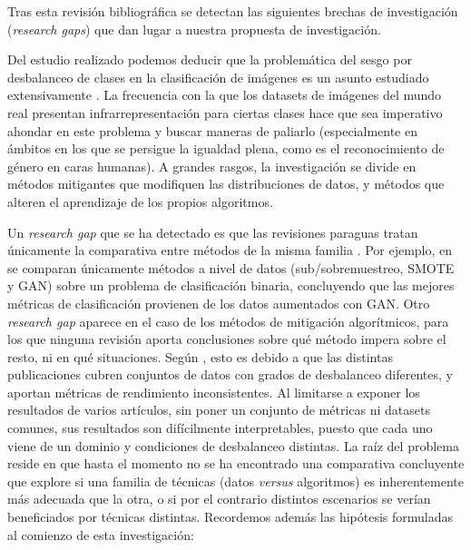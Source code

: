 Tras esta revisión bibliográfica se detectan las siguientes brechas de investigación (\textit{research gaps}) que dan lugar a nuestra propuesta de investigación. %


Del estudio realizado podemos deducir que la problemática del sesgo por desbalanceo de clases en la clasificación de imágenes es un asunto estudiado extensivamente \cite{johnson2019survey,aka2021measuring,kim2019multiaccuracy,krishnan2020understanding,li2019learning}. La frecuencia con la que los datasets de imágenes del mundo real presentan infrarrepresentación para ciertas clases hace que sea imperativo ahondar en este problema y buscar maneras de paliarlo (especialmente en ámbitos en los que se persigue la igualdad plena, como es el reconocimiento de género en caras humanas). A grandes rasgos, la investigación se divide en métodos mitigantes que modifiquen las distribuciones de datos, y métodos que alteren el aprendizaje de los propios algoritmos.

Un \textit{research gap} que se ha detectado es que las revisiones paraguas tratan únicamente la comparativa entre métodos de la misma familia \cite{nafi2020addressing, johnson2019survey}. Por ejemplo, en \citet{nafi2020addressing} se comparan únicamente métodos a nivel de datos (sub/sobremuestreo, SMOTE y GAN) sobre un problema de clasificación binaria, concluyendo que las mejores métricas de clasificación provienen de los datos aumentados con GAN. Otro \textit{research gap} aparece en el caso de los métodos de mitigación algorítmicos, para los que ninguna revisión aporta conclusiones sobre qué método impera sobre el resto, ni en qué situaciones. Según \citet{johnson2019survey}, esto es debido a que las distintas publicaciones cubren conjuntos de datos con grados de desbalanceo diferentes, y aportan métricas de rendimiento inconsistentes. Al limitarse a exponer los resultados de varios artículos, sin poner un conjunto de métricas ni datasets comunes, sus resultados son difícilmente interpretables, puesto que cada uno viene de un dominio y condiciones de desbalanceo distintas. La raíz del problema reside en que hasta el momento no se ha encontrado una comparativa concluyente que explore si una familia de técnicas (datos \textit{versus} algoritmos) es inherentemente más adecuada que la otra, o si por el contrario distintos escenarios se verían beneficiados por técnicas distintas.
Recordemos además las hipótesis formuladas al comienzo de esta investigación:

